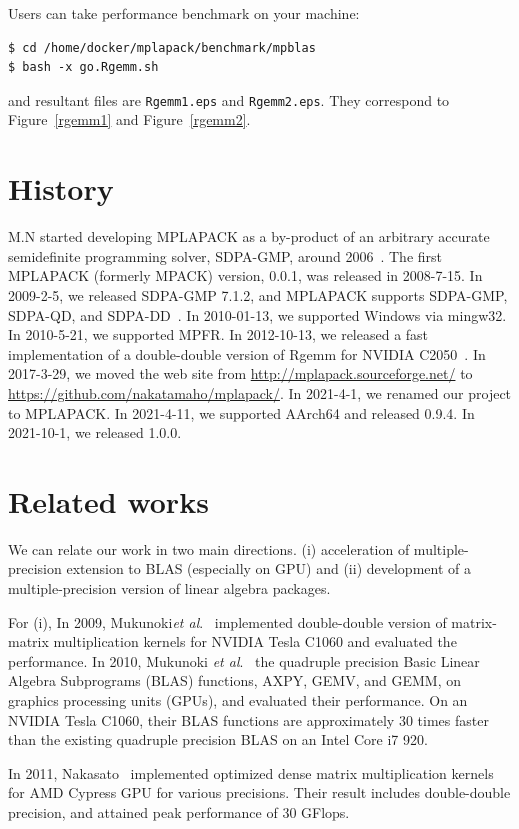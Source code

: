 \documentclass[12pt]{article}
\newcommand{\etal}{\textit{et al}.}
\begin{document}
Users can take performance benchmark on your machine:
\begin{verbatim}
$ cd /home/docker/mplapack/benchmark/mpblas
$ bash -x go.Rgemm.sh
\end{verbatim}
and resultant files are {\tt Rgemm1.eps}  and {\tt Rgemm2.eps}. They correspond to Figure~\ref{rgemm1} and Figure~\ref{rgemm2}.

\section{History}
\label{sec:history}
M.N started developing MPLAPACK as a by-product of an arbitrary accurate semidefinite programming solver, SDPA-GMP, around 2006~\cite{JCP2008}. The first MPLAPACK (formerly MPACK) version, 0.0.1, was released in 2008-7-15. In 2009-2-5, we released SDPA-GMP 7.1.2, and MPLAPACK supports SDPA-GMP, SDPA-QD, and SDPA-DD~\cite{SDPA-GMP,sdpa-gmpgithub,sdpa-qdgithub,sdpa-ddgithub}. In 2010-01-13, we supported Windows via mingw32. In 2010-5-21, we supported MPFR. In 2012-10-13, we released a fast implementation of a double-double version of Rgemm for NVIDIA C2050~\cite{6424545,6495966}. In 2017-3-29, we moved the web site from \url{http://mplapack.sourceforge.net/} to \url{https://github.com/nakatamaho/mplapack/}. In 2021-4-1, we renamed our project to MPLAPACK. In 2021-4-11, we supported AArch64 and released 0.9.4. In 2021-10-1, we released 1.0.0.

\section{Related works}
\label{sec:relatedworks}
We can relate our work in two main directions. (i) acceleration of multiple-precision extension to BLAS (especially on GPU) and (ii) development of a multiple-precision version of linear algebra packages.

For (i), In 2009, Mukunoki\etal{}~\cite{HPC-137_1} implemented double-double version of matrix-matrix multiplication kernels for NVIDIA Tesla C1060 and evaluated the performance. In 2010, Mukunoki \etal{}~\cite{10.1007/978-3-642-28151-8_25} the quadruple precision Basic Linear Algebra Subprograms (BLAS) functions, AXPY, GEMV, and GEMM, on graphics processing units (GPUs), and evaluated their performance. On an NVIDIA Tesla C1060, their BLAS functions are approximately 30 times faster than the existing quadruple precision BLAS on an Intel Core i7 920.

In 2011, Nakasato~\cite{Nakasato2011AFG} implemented optimized dense matrix multiplication kernels for AMD Cypress GPU for various precisions. Their result includes double-double precision, and attained peak performance of 30 GFlops.
\end{document}
